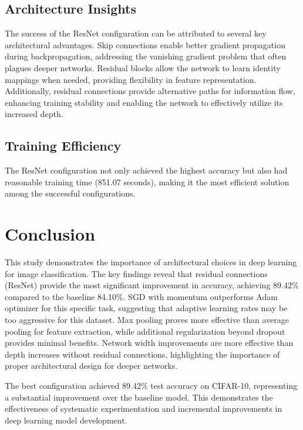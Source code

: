 \documentclass{article}
\begin{document}
\subsection{Architecture Insights}

The success of the ResNet configuration can be attributed to several key architectural advantages. Skip connections enable better gradient propagation during backpropagation, addressing the vanishing gradient problem that often plagues deeper networks. Residual blocks allow the network to learn identity mappings when needed, providing flexibility in feature representation. Additionally, residual connections provide alternative paths for information flow, enhancing training stability and enabling the network to effectively utilize its increased depth.

\subsection{Training Efficiency}

The ResNet configuration not only achieved the highest accuracy but also had reasonable training time (851.07 seconds), making it the most efficient solution among the successful configurations.

\section{Conclusion}

This study demonstrates the importance of architectural choices in deep learning for image classification. The key findings reveal that residual connections (ResNet) provide the most significant improvement in accuracy, achieving 89.42\% compared to the baseline 84.10\%. SGD with momentum outperforms Adam optimizer for this specific task, suggesting that adaptive learning rates may be too aggressive for this dataset. Max pooling proves more effective than average pooling for feature extraction, while additional regularization beyond dropout provides minimal benefits. Network width improvements are more effective than depth increases without residual connections, highlighting the importance of proper architectural design for deeper networks.

The best configuration achieved 89.42\% test accuracy on CIFAR-10, representing a substantial improvement over the baseline model. This demonstrates the effectiveness of systematic experimentation and incremental improvements in deep learning model development.
\end{document}
